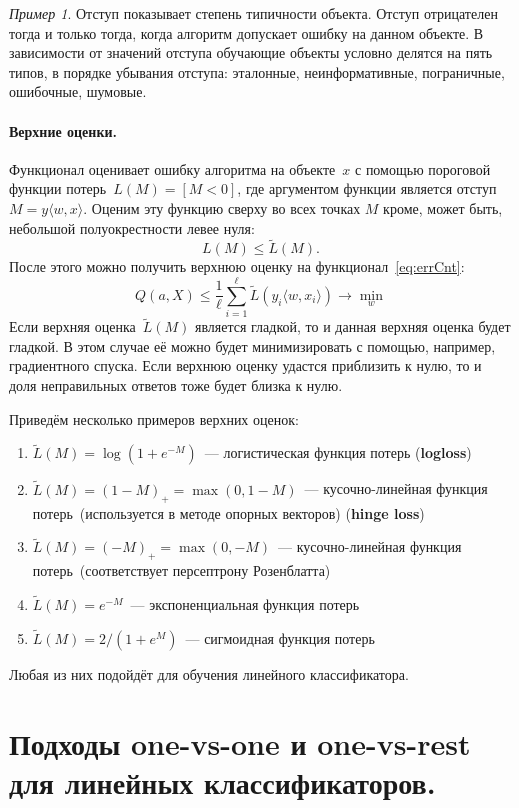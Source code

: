 \documentclass[a4paper, 12pt]{article}
\renewcommand{\leq}{\leqslant}
\theoremstyle{plain} %
\theoremstyle{definition} %
\theoremstyle{remark} %
\newtheorem{example}{Пример}
\begin{document}
\begin{example}
Отступ показывает степень типичности объекта. Отступ отрицателен тогда и только тогда, когда алгоритм допускает ошибку на данном объекте. В зависимости от значений отступа обучающие объекты условно делятся на пять типов, в порядке убывания отступа: эталонные, неинформативные, пограничные, ошибочные, шумовые.

\paragraph{Верхние оценки.}
Функционал оценивает ошибку алгоритма на объекте~$x$
с помощью пороговой функции потерь~$L(M) = [M < 0]$,
где аргументом функции является отступ~$M = y \langle w, x \rangle$.
Оценим эту функцию сверху во всех точках $M$ кроме, может быть, небольшой полуокрестности левее нуля:
\[
    L(M) \leq \tilde L(M).
\]
После этого можно получить верхнюю оценку на функционал~\eqref{eq:errCnt}:
\[
    Q(a, X)
    \leq
    \frac{1}{\ell}
    \sum_{i = 1}^{\ell}
        \tilde L(y_i \langle w, x_i \rangle)
    \to
    \min_w
\]
Если верхняя оценка~$\tilde L(M)$ является гладкой, то и данная верхняя оценка будет гладкой.
В этом случае её можно будет минимизировать с помощью, например, градиентного спуска.
Если верхнюю оценку удастся приблизить к нулю, то и доля неправильных ответов тоже будет близка к нулю.

Приведём несколько примеров верхних оценок:
\begin{enumerate}
    \item $\tilde L(M) = \log \left(1 + e^{-M} \right)$~--- логистическая функция потерь (\textbf{logloss})
    \item $\tilde L(M) = (1 - M)_+ = \max(0, 1 - M)$~--- кусочно-линейная функция потерь~(используется в методе опорных векторов) (\textbf{hinge loss})
    \item $\tilde L(M) = (-M)_+ = \max(0, -M)$~--- кусочно-линейная функция потерь~(соответствует персептрону Розенблатта)
    \item $\tilde L(M) = e^{-M}$~--- экспоненциальная функция потерь
    \item $\tilde L(M) = 2/(1 + e^M)$~--- сигмоидная функция потерь
\end{enumerate}
Любая из них подойдёт для обучения линейного классификатора.

\section{Подходы one-vs-one и one-vs-rest для линейных классификаторов.}


\end{example}
\end{document}
